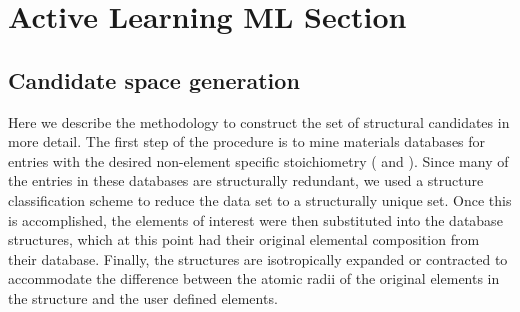 

\section{Active Learning ML Section}  %
%

\subsection{Candidate space generation}  %
%


%
Here we describe the methodology to construct the set of structural candidates in more detail. The first step of the procedure is to mine materials databases for entries with the desired non-element specific stoichiometry ( \ABtwo and \ABthree). Since many of the entries in these databases are structurally redundant, we used a structure classification scheme to reduce the data set to a structurally unique set. Once this is accomplished, the elements of interest were then substituted into the database structures, which at this point had their original elemental composition from their database. Finally, the structures are isotropically expanded or contracted to accommodate the difference between the atomic radii of the original elements in the structure and the user defined elements.


